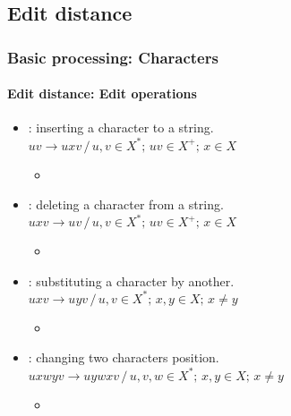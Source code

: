 \documentclass[xcolor=table]{beamer}
\begin{document}
\subsection{Edit distance}

\begin{frame}
\frametitle{Basic processing: Characters}
\framesubtitle{Edit distance: Edit operations}

\begin{itemize}
	\item {}: inserting a character to a string.\\
	$uv \rightarrow uxv \,/\, u, v \in X^*;\, uv \in X^+;\, x \in X$
	\begin{itemize}
		\item {}
	\end{itemize}
	
	\item {}: deleting a character from a string.\\
	$uxv \rightarrow uv \,/\, u, v \in X^*;\, uv \in X^+;\, x \in X$
	\begin{itemize}
		\item {}
	\end{itemize}
	
	\item {}: substituting a character by another.\\
	$uxv \rightarrow uyv \,/\, u, v \in X^*;\, x, y \in X;\, x \ne y$
	\begin{itemize}
		\item {}
	\end{itemize}
	
	\item {}: changing two characters position.\\
	$uxwyv \rightarrow uywxv \,/\, u, v, w \in X^*;\, x, y \in X;\, x \ne y$
	\begin{itemize}
		\item {}
	\end{itemize}
\end{itemize}

\end{frame}
\end{document}
